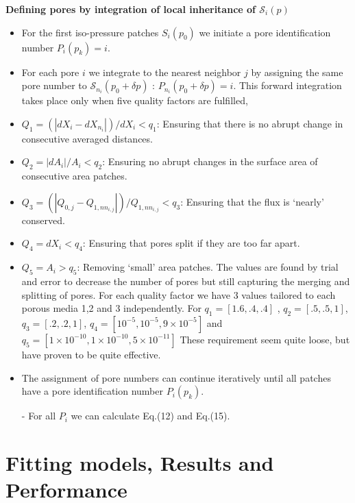 \documentclass[draft,jgrga]{agutexSI2019}
\begin{document}
\begin{article}
\noindent\textbf{Defining pores by integration of local inheritance of $\mathcal{S}_i(p)$}
\begin{itemize}
	\item For the first iso-pressure patches $S_i(p_0)$ we initiate a pore identification number $P_i(p_k) = i$. 
	\item For each pore $i$ we integrate to the nearest neighbor $j$ by assigning the same pore number to $\mathcal{S}_{n_i}(p_0+\delta p)$ : $P_{n_i}(p_0+\delta p) = i$. This forward integration takes place only when five quality factors are fulfilled,
	\item $Q_1 = (|dX_i-dX_{n_i}|)/dX_i<q_1$: Ensuring that there is no abrupt change in consecutive averaged distances. 
	\item $Q_2 = |dA_i|/A_i<q_2$: Ensuring no abrupt changes in the surface area of consecutive area patches. 
	\item $Q_3 = (|Q_{0,j}-Q_{1,nn_{i,j}}|)/Q_{1,nn_{i,j}}<q_3$: Ensuring that the flux is `nearly' conserved.  
	\item $Q_4 = dX_i < q_4$: Ensuring that pores split if they are too far apart. 
	\item $Q_5 = A_i > q_5$: Removing `small' area patches. 
	The values are found by trial and error to decrease the number of pores but still capturing the merging and splitting of pores. For each quality factor we have 3 values tailored to each porous media 1,2 and 3 independently. For $q_1 = [1.6,.4,.4]$
, $q_2 = [.5,.5,1]$, $q_3 = [.2,.2,1]$, $q_4 = [10^{-5},10^{-5},9\times10^{-5}]$ and $q_5 = [1\times10^{-10},1\times10^{-10},5\times10^{-11}]$	These requirement seem quite loose, but have proven to be quite effective. 
	\item The assignment of pore numbers can continue iteratively until all patches have a pore identification number $P_i(p_k)$.	
	\item[-]For all $P_i$ we can calculate Eq.(12) and Eq.(15).
\end{itemize}



\section{Fitting models, Results and Performance}

\end{article}
\end{document}

